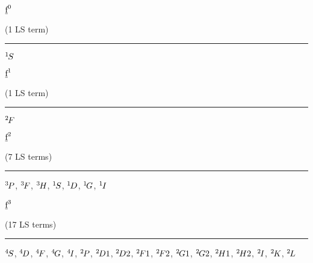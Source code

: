 \begin{mdframed}
\begin{center}
$\underbar{$\text{f}$}^{0}$

(1 LS term)
\vspace{0.25cm}
\hrule
\vspace{0.25cm}

${}^{1}{\kern-0.1em}{S}$
\end{center}
\end{mdframed}

\begin{mdframed}
\begin{center}
$\underbar{$\text{f}$}^{1}$

(1 LS term)
\vspace{0.25cm}
\hrule
\vspace{0.25cm}

${}^{2}{\kern-0.1em}{F}$
\end{center}
\end{mdframed}

\begin{mdframed}
\begin{center}
$\underbar{$\text{f}$}^{2}$

(7 LS terms)
\vspace{0.25cm}
\hrule
\vspace{0.25cm}

${}^{3}{\kern-0.1em}{P}$, ${}^{3}{\kern-0.1em}{F}$, ${}^{3}{\kern-0.1em}{H}$, ${}^{1}{\kern-0.1em}{S}$, ${}^{1}{\kern-0.1em}{D}$, ${}^{1}{\kern-0.1em}{G}$, ${}^{1}{\kern-0.1em}{I}$
\end{center}
\end{mdframed}

\begin{mdframed}
\begin{center}
$\underbar{$\text{f}$}^{3}$

(17 LS terms)
\vspace{0.25cm}
\hrule
\vspace{0.25cm}

${}^{4}{\kern-0.1em}{S}$, ${}^{4}{\kern-0.1em}{D}$, ${}^{4}{\kern-0.1em}{F}$, ${}^{4}{\kern-0.1em}{G}$, ${}^{4}{\kern-0.1em}{I}$, ${}^{2}{\kern-0.1em}{P}$, ${}^{2}{\kern-0.1em}{D1}$, ${}^{2}{\kern-0.1em}{D2}$, ${}^{2}{\kern-0.1em}{F1}$, ${}^{2}{\kern-0.1em}{F2}$, ${}^{2}{\kern-0.1em}{G1}$, ${}^{2}{\kern-0.1em}{G2}$, ${}^{2}{\kern-0.1em}{H1}$, ${}^{2}{\kern-0.1em}{H2}$, ${}^{2}{\kern-0.1em}{I}$, ${}^{2}{\kern-0.1em}{K}$, ${}^{2}{\kern-0.1em}{L}$
\end{center}
\end{mdframed}

